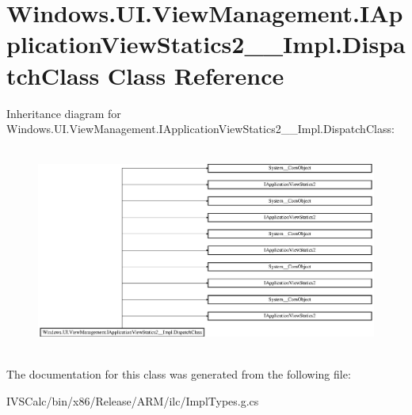 \hypertarget{class_windows_1_1_u_i_1_1_view_management_1_1_i_application_view_statics2_____impl_1_1_dispatch_class}{}\section{Windows.\+U\+I.\+View\+Management.\+I\+Application\+View\+Statics2\+\_\+\+\_\+\+Impl.\+Dispatch\+Class Class Reference}
\label{class_windows_1_1_u_i_1_1_view_management_1_1_i_application_view_statics2_____impl_1_1_dispatch_class}
Inheritance diagram for Windows.\+U\+I.\+View\+Management.\+I\+Application\+View\+Statics2\+\_\+\+\_\+\+Impl.\+Dispatch\+Class\+:\begin{figure}[H]
\begin{center}
\leavevmode
\includegraphics[height=6.829268cm]{class_windows_1_1_u_i_1_1_view_management_1_1_i_application_view_statics2_____impl_1_1_dispatch_class}
\end{center}
\end{figure}


The documentation for this class was generated from the following file\+:\begin{DoxyCompactItemize}
\item 
I\+V\+S\+Calc/bin/x86/\+Release/\+A\+R\+M/ilc/Impl\+Types.\+g.\+cs\end{DoxyCompactItemize}
